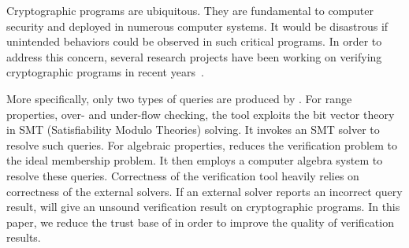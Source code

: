 
Cryptographic programs are ubiquitous. They are fundamental to
computer security and deployed in numerous computer systems. It would
be disastrous if unintended behaviors could be observed in such
critical programs. In order to address this concern, several research
projects have been working on verifying cryptographic programs in
recent years~\cite{}.






More specifically, only two types of queries are produced by
\cryptoline. For range properties, over- and under-flow checking, the
tool exploits the bit vector theory in SMT (Satisfiability Modulo
Theories) solving. It invokes an SMT solver to resolve such
queries. For algebraic properties, \cryptoline reduces the
verification problem to the ideal membership problem. It then employs
a computer algebra system to resolve these queries. Correctness of the
verification tool heavily relies on correctness of the external
solvers. If an external solver reports an incorrect query
result, \cryptoline will give an unsound verification result on
cryptographic programs. In this paper, we reduce the trust base
of \cryptoline in order to improve the quality of verification
results.




